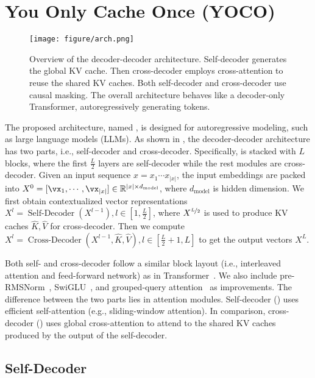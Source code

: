 \section{You Only Cache Once (YOCO)}
\label{sec:arch}

\begin{figure*}[t]
\centering
\captionsetup{type=figure}
\texttt{[image: figure/arch.png]}
\caption{Overview of the decoder-decoder architecture. Self-decoder generates the global KV cache. Then cross-decoder employs cross-attention to reuse the shared KV caches.
Both self-decoder and cross-decoder use causal masking.
The overall architecture behaves like a decoder-only Transformer, autoregressively generating tokens.
}
\label{fig:yoco}
\end{figure*}

The proposed architecture, named \our{}, is designed for autoregressive modeling, such as large language models (LLMs).
As shown in , the decoder-decoder architecture has two parts, i.e., self-decoder and cross-decoder.
Specifically, \our{} is stacked with $L$ blocks, where the first $\frac{L}{2}$ layers are self-decoder while the rest modules are cross-decoder.
Given an input sequence $x = x_1 \cdots x_{|x|}$, the input embeddings are packed into $X^0 = [\vx_1, \cdots, \vx_{|x|}] \in \mathbb{R}^{|x|\times d_\text{model}}$, where $d_\text{model}$ is hidden dimension.
We first obtain contextualized vector representations $X^{l} = \operatorname{Self-Decoder}(X^{l-1}), l \in [1, \frac{L}{2}]$, where $X^{\nicefrac{L}{2}}$ is used to produce KV caches $\hat{K}, \hat{V}$ for cross-decoder.
Then we compute $X^{l} = \operatorname{Cross-Decoder}(X^{l-1}, \hat{K}, \hat{V}), l \in [\frac{L}{2}+1, L]$ to get the output vectors $X^{L}$.

Both self- and cross-decoder follow a similar block layout (i.e., interleaved attention and feed-forward network) as in Transformer~\cite{transformer}. We also include pre-RMSNorm~\cite{rmsnorm}, SwiGLU~\cite{glu}, and grouped-query attention~\cite{gqa} as improvements.
The difference between the two parts lies in attention modules.
Self-decoder () uses efficient self-attention (e.g., sliding-window attention).
In comparison, cross-decoder () uses global cross-attention to attend to the shared KV caches produced by the output of the self-decoder.

\subsection{Self-Decoder}
\label{sec:self:decoder}

